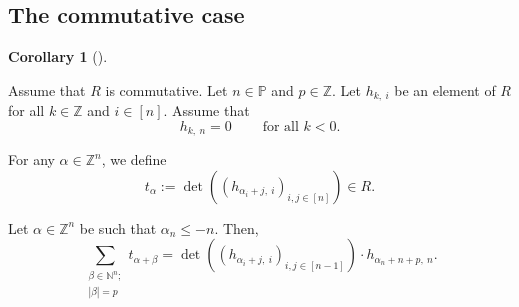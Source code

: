 \documentclass
[numbers=enddot,12pt,final,onecolumn,notitlepage,english]{scrartcl}%
\theoremstyle{definition}
\newtheorem{coro}[theo]{Corollary}
\newenvironment{corollary}[1][]
{\begin{coro}[#1]\begin{leftbar}}
{\end{leftbar}\end{coro}}
\let\sumnonlimits\sum
\renewcommand{\sum}{\sumnonlimits\limits}
\begin{document}
\subsection{The commutative case}

\begin{corollary}
\label{cor.pre-pieri.2comm}Assume that $R$ is commutative. Let $n\in
\mathbb{P}$ and $p\in\mathbb{Z}$. Let $h_{k,\ i}$ be an element of $R$ for all
$k\in\mathbb{Z}$ and $i\in\left[  n\right]  $. Assume that%
\[
h_{k,\ n}=0\ \ \ \ \ \ \ \ \ \ \text{for all }k<0.
\]


For any $\alpha\in\mathbb{Z}^{n}$, we define%
\[
t_{\alpha}:=\det\left(  \left(  h_{\alpha_{i}+j,\ i}\right)  _{i,j\in\left[
n\right]  }\right)  \in R.
\]


Let $\alpha\in\mathbb{Z}^{n}$ be such that $\alpha_{n}\leq-n$. Then,%
\[
\sum_{\substack{\beta\in\mathbb{N}^{n};\\\left\vert \beta\right\vert
=p}}t_{\alpha+\beta}=\det\left(  \left(  h_{\alpha_{i}+j,\ i}\right)
_{i,j\in\left[  n-1\right]  }\right)  \cdot h_{\alpha_{n}+n+p,\ n}.
\]

\end{corollary}
\end{document}
